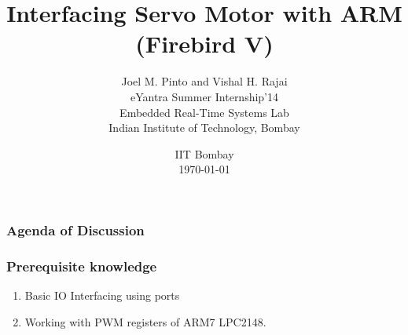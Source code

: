 \documentclass[table,10pt,red]{beamer}	%
\title
[
	Servo Interfacing with ARM	%
	\hspace{0.5cm}
	\insertframenumber/\inserttotalframenumber
]
{
	Interfacing Servo Motor with ARM (Firebird V)
}
\author
[
	Vishal and Joel 	%
]
{
  Joel M. Pinto and Vishal H. Rajai\\
  eYantra Summer Internship'14\\
  Embedded Real-Time Systems Lab\\
  Indian Institute of Technology, Bombay\\
}
\date
{
IIT Bombay \\ {\today}	%
}
\begin{document}
\begin{frame}
	\titlepage
\end{frame}

\begin{frame}
	\frametitle{Agenda of Discussion}


	\tableofcontents
\end{frame}

\begin{frame}
	\frametitle{Prerequisite knowledge}
	\begin{enumerate}
		\item Basic IO Interfacing using ports
		\item Working with PWM registers of ARM7 LPC2148.


	\end{enumerate}
\end{frame}
\end{document}
